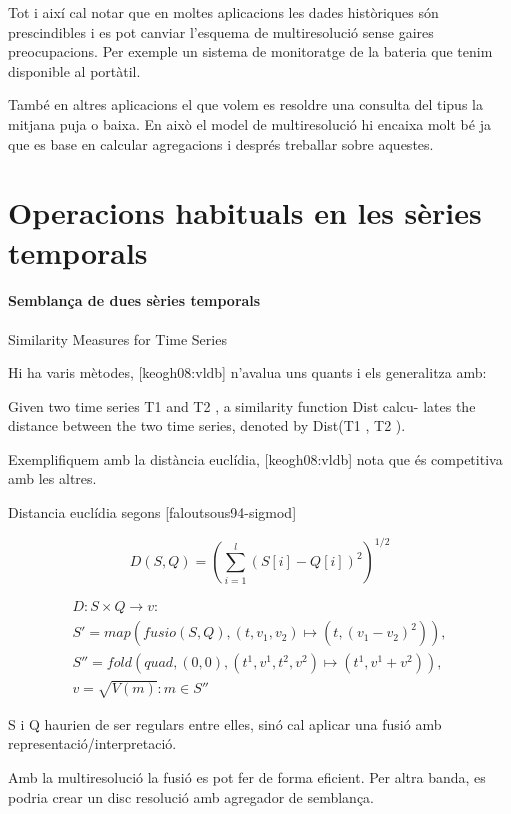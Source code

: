 Tot i així cal notar que en moltes aplicacions les dades històriques
són prescindibles i es pot canviar l'esquema de multiresolució sense
gaires preocupacions. Per exemple un sistema de monitoratge de la
bateria que tenim disponible al portàtil.

També en altres aplicacions el que volem es resoldre una consulta del tipus la mitjana puja o baixa. En això el model de multiresolució hi encaixa molt bé ja que es base en calcular agregacions i després treballar sobre aquestes. 









\section{Operacions habituals en les sèries temporals}


\paragraph{Semblança de dues sèries temporals}


Similarity Measures for Time Series

Hi ha varis mètodes, [keogh08:vldb] n'avalua uns quants i els generalitza amb:

Given two
time series T1 and T2 , a similarity function Dist calcu-
lates the distance between the two time series, denoted by
Dist(T1 , T2 ).

Exemplifiquem amb la distància euclídia, [keogh08:vldb] nota que és
competitiva amb les altres.

Distancia euclídia segons [faloutsous94-sigmod]


\[
D(S,Q) = \left( \sum_{i=1}^{l} (S[i]-Q[i])^2  \right)^{1/2}
\]

\begin{gather*}
  D: S \times Q \longrightarrow v: \\
  S' = map(fusio(S,Q),(t,v_1,v_2)\mapsto(t,(v_1-v_2)^2)), \\
  S'' = fold(quad,(0,0),(t^1,v^1,t^2,v^2)\mapsto(t^1,v^1+v^2)), \\
  v = \sqrt{V(m)}:m\in S''
\end{gather*}


S i Q haurien de ser regulars entre elles, sinó cal aplicar una fusió amb representació/interpretació.

Amb la multiresolució la fusió es pot fer de forma eficient. Per altra banda, es podria crear un disc resolució amb agregador de semblança.


